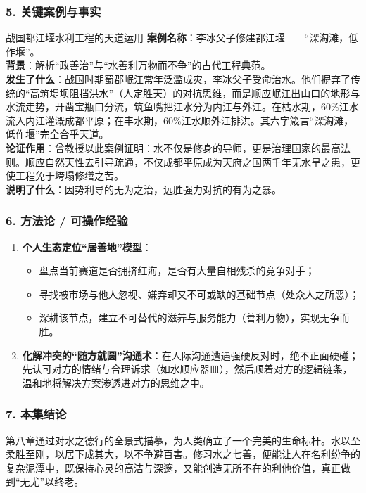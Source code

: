 \subsubsection{5. 关键案例与事实}
\begin{CaseBox}{战国都江堰水利工程的天道运用}
\textbf{案例名称}：李冰父子修建都江堰——“深淘滩，低作堰”。\\
\textbf{背景}：解析“政善治”与“水善利万物而不争”的古代工程典范。\\
\textbf{发生了什么}：战国时期蜀郡岷江常年泛滥成灾，李冰父子受命治水。他们摒弃了传统的“高筑堤坝阻挡洪水”（人定胜天）的对抗思维，而是顺应岷江出山口的地形与水流走势，开凿宝瓶口分流，筑鱼嘴把江水分为内江与外江。在枯水期，60\%江水流入内江灌溉成都平原；在丰水期，60\%江水顺外江排洪。其六字箴言“深淘滩，低作堰”完全合乎天道。\\
\textbf{论证作用}：曾教授以此案例证明：水不仅是修身的导师，更是治理国家的最高法则。顺应自然天性去引导疏通，不仅成都平原成为天府之国两千年无水旱之患，更使工程免于垮塌修缮之苦。\\
\textbf{说明了什么}：因势利导的无为之治，远胜强力对抗的有为之暴。
\end{CaseBox}

\subsubsection{6. 方法论 / 可操作经验}
\begin{enumerate}
    \item \textbf{个人生态定位“居善地”模型}：
    \begin{itemize}
        \item 盘点当前赛道是否拥挤红海，是否有大量自相残杀的竞争对手；
        \item 寻找被市场与他人忽视、嫌弃却又不可或缺的基础节点（处众人之所恶）；
        \item 深耕该节点，建立不可替代的滋养与服务能力（善利万物），实现无争而胜。
    \end{itemize}
    \item \textbf{化解冲突的“随方就圆”沟通术}：在人际沟通遭遇强硬反对时，绝不正面硬碰；先认可对方的情绪与合理诉求（如水顺应器皿），然后顺着对方的逻辑链条，温和地将解决方案渗透进对方的思维之中。
\end{enumerate}

\subsubsection{7. 本集结论}
第八章通过对水之德行的全景式描摹，为人类确立了一个完美的生命标杆。水以至柔胜至刚，以居下成其大，以不争避百害。修习水之七善，便能让人在名利纷争的复杂泥潭中，既保持心灵的高洁与深邃，又能创造无所不在的利他价值，真正做到“无尤”以终老。

